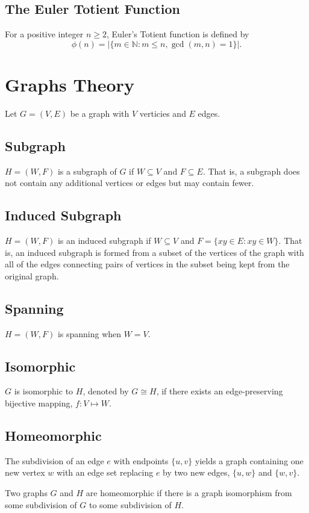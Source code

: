 \documentclass{article}
\begin{document}
\subsection{The Euler Totient Function}
For a positive integer $n\geq2$, Euler's Totient function is defined by 
\[
\phi(n)=|\{m\in \mathbb N: m\le n,  \gcd(m,n)=1\}|.
\]

\section{Graphs Theory}
Let $G = (V, E)$ be a graph with $V$ verticies and $E$ edges. 

\subsection{Subgraph}
$H = (W, F)$ is a subgraph of $G$ if $W \subseteq V$ and $F \subseteq E$. That is, a subgraph does not contain any additional vertices or edges but may contain fewer.

\subsection{Induced Subgraph}
$H = (W, F)$ is an induced subgraph if $W \subseteq V$ and $F = \{ xy \in E : xy \in W \}$. That is,  an induced subgraph is formed from a subset of the vertices of the graph with all of the edges connecting pairs of vertices in the subset being kept from the original graph.

\subsection{Spanning}
$H = (W, F)$ is spanning when $W = V$.

\subsection{Isomorphic}
$G$ is isomorphic to $H$, denoted by $G \cong H$, if there exists an edge-preserving bijective mapping, $f: V \mapsto W$.

\subsection{Homeomorphic}
The subdivision of an edge $e$ with endpoints $\{u,v\}$ yields a graph containing one new vertex $w$ with an edge set replacing $e$ by two new edges, $\{u,w\}$ and $\{w,v\}$.

Two graphs $G$ and $H$ are homeomorphic if there is a graph isomorphism from some subdivision of $G$ to some subdivision of $H$.
\end{document}
